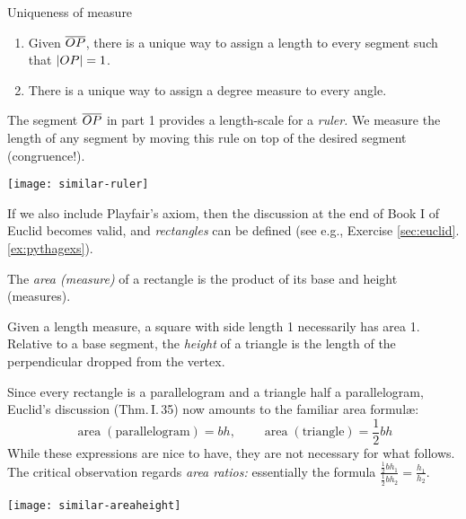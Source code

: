 \begin{thm}{Uniqueness of measure}{}
	\begin{enumerate}
	  \item Given $\overline{OP}$, there is a unique way to assign a length to every segment such that $\left| OP\right|=1$.
	  \item There is a unique way to assign a degree measure to every angle.
	\end{enumerate}
\end{thm}

\begin{minipage}[t]{0.49\linewidth}\vspace{0pt}
	The segment $\overline{OP}$ in part 1 provides a length-scale for a \emph{ruler.} We measure the length of any segment by moving this rule on top of the desired segment (congruence!).
\end{minipage}
\hfill
\begin{minipage}[t]{0.49\linewidth}\vspace{-5pt}
	\flushright
	\texttt{[image: similar-ruler]}
\end{minipage}


\goodbreak


If we also include Playfair's axiom, then the discussion at the end of Book I of Euclid becomes valid, and \emph{rectangles} can be defined (see e.g., Exercise \ref*{sec:euclid}.\ref{ex:pythagexs}).

\begin{defn}{}{}
	The \emph{area (measure)} of a rectangle is the product of its base and height (measures).
\end{defn}

Given a length measure, a square with side length 1 necessarily has area 1. Relative to a base segment, the \emph{height} of a triangle is the length of the perpendicular dropped from the vertex.\par

\begin{minipage}[t]{0.8\linewidth}\vspace{0pt}
	Since every rectangle is a parallelogram and a triangle half a parallelogram, Euclid's discussion (Thm.\,I.\,35) now amounts to the familiar area formulæ:
	\[
		\operatorname{area}(\text{parallelogram})=bh,\qquad \operatorname{area}(\text{triangle})=\frac 12bh
	\]
	While these expressions are nice to have, they are not necessary for what follows. The critical observation regards \emph{area ratios:} essentially the formula $\frac{\frac 12bh_1}{\frac 12bh_2}=\frac{h_1}{h_2}$.
\end{minipage}
\hfill
\begin{minipage}[t]{0.19\linewidth}\vspace{0pt}
	\flushright
	\texttt{[image: similar-areaheight]}
\end{minipage}



